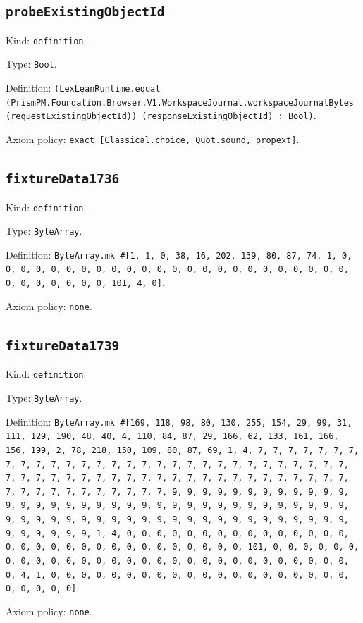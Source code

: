 \documentclass[11pt]{article}
\begin{document}
\subsection*{\texttt{probeExistingObjectId}}
\noindent Kind: \texttt{definition}.\par
\noindent Type: \texttt{Bool}.\par
\noindent Definition: \texttt{(LexLeanRuntime.equal (PrismPM.Foundation.Browser.V1.WorkspaceJournal.workspaceJournalBytes (requestExistingObjectId)) (responseExistingObjectId) : Bool)}.\par
\noindent Axiom policy: \texttt{exact [Classical.choice, Quot.sound, propext]}.\par
\subsection*{\texttt{fixtureData1736}}
\noindent Kind: \texttt{definition}.\par
\noindent Type: \texttt{ByteArray}.\par
\noindent Definition: \texttt{ByteArray.mk \#[1, 1, 0, 38, 16, 202, 139, 80, 87, 74, 1, 0, 0, 0, 0, 0, 0, 0, 0, 0, 0, 0, 0, 0, 0, 0, 0, 0, 0, 0, 0, 0, 0, 0, 0, 0, 0, 0, 0, 0, 0, 0, 101, 4, 0]}.\par
\noindent Axiom policy: \texttt{none}.\par
\subsection*{\texttt{fixtureData1739}}
\noindent Kind: \texttt{definition}.\par
\noindent Type: \texttt{ByteArray}.\par
\noindent Definition: \texttt{ByteArray.mk \#[169, 118, 98, 80, 130, 255, 154, 29, 99, 31, 111, 129, 190, 48, 40, 4, 110, 84, 87, 29, 166, 62, 133, 161, 166, 156, 199, 2, 78, 218, 150, 109, 80, 87, 69, 1, 4, 7, 7, 7, 7, 7, 7, 7, 7, 7, 7, 7, 7, 7, 7, 7, 7, 7, 7, 7, 7, 7, 7, 7, 7, 7, 7, 7, 7, 7, 7, 7, 7, 7, 7, 7, 7, 7, 7, 7, 7, 7, 7, 7, 7, 7, 7, 7, 7, 7, 7, 7, 7, 7, 7, 7, 7, 7, 7, 7, 7, 7, 7, 7, 7, 9, 9, 9, 9, 9, 9, 9, 9, 9, 9, 9, 9, 9, 9, 9, 9, 9, 9, 9, 9, 9, 9, 9, 9, 9, 9, 9, 9, 9, 9, 9, 9, 9, 9, 9, 9, 9, 9, 9, 9, 9, 9, 9, 9, 9, 9, 9, 9, 9, 9, 9, 9, 9, 9, 9, 9, 9, 9, 9, 9, 9, 9, 9, 9, 1, 4, 0, 0, 0, 0, 0, 0, 0, 0, 0, 0, 0, 0, 0, 0, 0, 0, 0, 0, 0, 0, 0, 0, 0, 0, 0, 0, 0, 0, 0, 0, 0, 101, 0, 0, 0, 0, 0, 0, 0, 0, 0, 0, 0, 0, 0, 0, 0, 0, 0, 0, 0, 0, 0, 0, 0, 0, 0, 0, 0, 0, 0, 0, 4, 1, 0, 0, 0, 0, 0, 0, 0, 0, 0, 0, 0, 0, 0, 0, 0, 0, 0, 0, 0, 0, 0, 0, 0, 0, 0]}.\par
\noindent Axiom policy: \texttt{none}.\par
\end{document}
